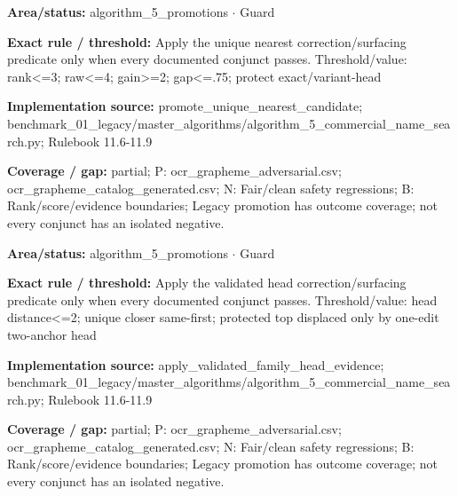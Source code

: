 \begin{tcolorbox}[enhanced,breakable,colback=white,colframe=Muted!45,boxrule=0.45pt,arc=1.5pt,left=6pt,right=6pt,top=5pt,bottom=5pt,title={\texttt{A5-PROMOTE-UNIQUE-NEAREST}},title after break={\texttt{A5-PROMOTE-UNIQUE-NEAREST}\ (continued)},fonttitle=\headingfont\bfseries\color{Navy},coltitle=Navy]
\textbf{Area/status:} algorithm\_\allowbreak{}5\_\allowbreak{}promotions $\boldsymbol{\cdot}$ Guard\par
\smallskip
\textbf{Exact rule / threshold:} Apply the unique nearest correction/\allowbreak{}surfacing predicate only when every documented conjunct passes. Threshold/\allowbreak{}value: rank<=3; raw<=4; gain>=2; gap<=.75; protect exact/\allowbreak{}variant-head\par
\smallskip
\textbf{Implementation source:} promote\_\allowbreak{}unique\_\allowbreak{}nearest\_\allowbreak{}candidate; benchmark\_\allowbreak{}01\_\allowbreak{}legacy/\allowbreak{}master\_\allowbreak{}algorithms/\allowbreak{}algorithm\_\allowbreak{}5\_\allowbreak{}commercial\_\allowbreak{}name\_\allowbreak{}search.py; Rulebook 11.6-11.9\par
\smallskip
\textbf{Coverage / gap:} partial; P: ocr\_\allowbreak{}grapheme\_\allowbreak{}adversarial.csv; ocr\_\allowbreak{}grapheme\_\allowbreak{}catalog\_\allowbreak{}generated.csv; N: Fair/\allowbreak{}clean safety regressions; B: Rank/\allowbreak{}score/\allowbreak{}evidence boundaries; Legacy promotion has outcome coverage; not every conjunct has an isolated negative.
\end{tcolorbox}
\begin{tcolorbox}[enhanced,breakable,colback=white,colframe=Muted!45,boxrule=0.45pt,arc=1.5pt,left=6pt,right=6pt,top=5pt,bottom=5pt,title={\texttt{A5-PROMOTE-VALIDATED-HEAD}},title after break={\texttt{A5-PROMOTE-VALIDATED-HEAD}\ (continued)},fonttitle=\headingfont\bfseries\color{Navy},coltitle=Navy]
\textbf{Area/status:} algorithm\_\allowbreak{}5\_\allowbreak{}promotions $\boldsymbol{\cdot}$ Guard\par
\smallskip
\textbf{Exact rule / threshold:} Apply the validated head correction/\allowbreak{}surfacing predicate only when every documented conjunct passes. Threshold/\allowbreak{}value: head distance<=2; unique closer same-first; protected top displaced only by one-edit two-anchor head\par
\smallskip
\textbf{Implementation source:} apply\_\allowbreak{}validated\_\allowbreak{}family\_\allowbreak{}head\_\allowbreak{}evidence; benchmark\_\allowbreak{}01\_\allowbreak{}legacy/\allowbreak{}master\_\allowbreak{}algorithms/\allowbreak{}algorithm\_\allowbreak{}5\_\allowbreak{}commercial\_\allowbreak{}name\_\allowbreak{}search.py; Rulebook 11.6-11.9\par
\smallskip
\textbf{Coverage / gap:} partial; P: ocr\_\allowbreak{}grapheme\_\allowbreak{}adversarial.csv; ocr\_\allowbreak{}grapheme\_\allowbreak{}catalog\_\allowbreak{}generated.csv; N: Fair/\allowbreak{}clean safety regressions; B: Rank/\allowbreak{}score/\allowbreak{}evidence boundaries; Legacy promotion has outcome coverage; not every conjunct has an isolated negative.
\end{tcolorbox}
